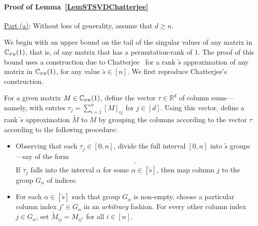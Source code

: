 \documentclass[11pt, hidelinks]{article} %
\newcommand{\real}{\ensuremath{\mathbb{R}}}
\newcommand{\numrows}{n}
\newcommand{\numcols}{d}
\newcommand{\wtmatrix}{M}
\newcommand{\wt}{\wtmatrix}
\newcommand{\matrixset}{\mathbb{C}}
\newcommand{\permset}{\matrixset_{\mbox{\tiny PR}}}
\begin{document}



\paragraph{Proof of Lemma~\ref{LemSTSVDChatterjee}}
\underline{Part (a)}: Without loss of generality, assume that
$\numcols \geq \numrows$.

We begin with an upper bound on the tail of the singular values of any matrix in $\permset(1)$, that is, of any matrix that has a permutation-rank of $1$. The proof of this bound uses a construction due to
Chatterjee~\cite{chatterjee2014matrix} for a rank $\widetilde{s}$ approximation of any matrix in $\permset(1)$, for any value $\widetilde{s} \in [\numrows]$. We first reproduce Chatterjee's construction.

For a given matrix $\wt \in \permset(1)$, 
define the vector $\tau \in \real^\numcols$ of column sums---namely,
with entries $\tau_j = \sum_{i=1}^\numrows [\wt]_{ij}$ for $j \in
[\numcols]$.  Using this vector, define a rank $\widetilde{s}$
approximation $\widetilde{\wt}$ to $\wt$ by grouping the
columns according to the vector $\tau$ according to the following procedure:
%
\begin{itemize}
\item
  Observing that each $\tau_j \in [0,\numrows]$, divide the full
  interval $[0,\numrows]$ into $\widetilde{s}$ groups---say of the
  form
  \begin{align*}
    [0,\numrows/\widetilde{s}), [\numrows/\widetilde{s},
        2\numrows/\widetilde{s}), \ldots
        [(\widetilde{s}-1)\numrows/\widetilde{s},\numrows].
  \end{align*}
  If $\tau_j$ falls into the interval $\alpha$ for some $\alpha \in
  [\widetilde{s}]$, then map column $j$ to the group $G_\alpha$ of
  indices.
    \item For each $\alpha \in [\widetilde{s}]$ such that group
      $G_\alpha$ is non-empty, choose a particular column index $j' 
      \in G_\alpha$ in an \emph{arbitrary} fashion.  For every other
      column index $j \in G_\alpha$, set $\widetilde{\wt}_{ij} =
      \wt_{i j'}$ for all $i \in [\numrows]$.
\end{itemize}
%

\vspace*{.04in}
\end{document}
